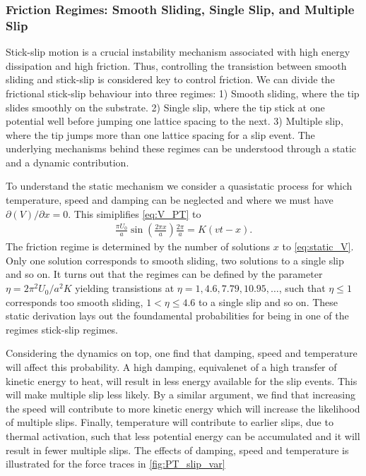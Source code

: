\subsubsection{Friction Regimes: Smooth Sliding, Single Slip, and Multiple Slip}
Stick-slip motion is a crucial instability mechanism associated with high energy dissipation and high friction. Thus, controlling the transistion between smooth sliding and stick-slip is considered key to control friction. We can divide the frictional stick-slip behaviour into three regimes: 1) Smooth sliding, where the tip slides smoothly on the substrate. 2) Single slip, where the tip stick at one potential well before jumping one lattice spacing to the next. 3) Multiple slip, where the tip jumps more than one lattice spacing for a slip event. The underlying mechanisms behind these regimes can be understood through a static and a dynamic contribution. 

To understand the static mechanism we consider a quasistatic process for which temperature, speed and damping can be neglected and where we must have $\partial(V)/\partial x = 0$. This simiplifies \cref{eq:V_PT} to 
\begin{align}
  \frac{\pi U_0}{a} \sin\left(\frac{2\pi x}{a}\right) \frac{2 \pi}{a} = K(vt - x).
  \label{eq:static_V}
\end{align}
The friction regime is determined by the number of solutions $x$ to \cref{eq:static_V}. Only one solution corresponds to
smooth sliding, two solutions to a single slip and so on. It turns out that the
regimes can be defined by the parameter $\eta = 2\pi^2U_0/a^2K$ \cite{Johnson_1998, Medyanik_2006} yielding transistions at $\eta = 1, 4.6, 7.79, 10.95, \hdots$, such that $\eta \le 1$
corresponds too smooth sliding, $1<\eta \le 4.6$ to a single slip and so on. These static derivation lays out the foundamental probabilities for being in one of the regimes stick-slip regimes. 

Considering the dynamics on top, one find that damping, speed and temperature will affect this probability. A high damping, equivalenet of a high transfer
of kinetic energy to heat, will result in less energy available for the slip events. This will make multiple slip less likely. By a similar argument, we find that increasing the speed will contribute to more kinetic energy which will increase the likelihood of multiple slips. Finally, temperature will contribute to earlier slips, due to thermal activation, such that
less potential energy can be accumulated and it will result in fewer multiple slips. The effects of damping, speed and temperature is illustrated for the force traces in \cref{fig:PT_slip_var}

